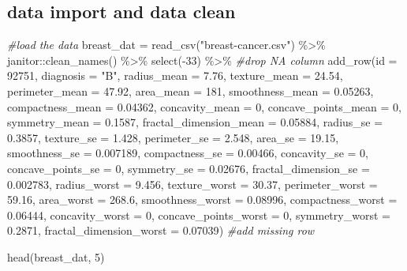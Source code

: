 \documentclass[
]{article}
\newenvironment{Shaded}{\begin{snugshade}}{\end{snugshade}}
\newcommand{\AttributeTok}[1]{\textcolor[rgb]{0.77,0.63,0.00}{#1}}
\newcommand{\CommentTok}[1]{\textcolor[rgb]{0.56,0.35,0.01}{\textit{#1}}}
\newcommand{\DecValTok}[1]{\textcolor[rgb]{0.00,0.00,0.81}{#1}}
\newcommand{\FloatTok}[1]{\textcolor[rgb]{0.00,0.00,0.81}{#1}}
\newcommand{\FunctionTok}[1]{\textcolor[rgb]{0.00,0.00,0.00}{#1}}
\newcommand{\NormalTok}[1]{#1}
\newcommand{\OtherTok}[1]{\textcolor[rgb]{0.56,0.35,0.01}{#1}}
\newcommand{\SpecialCharTok}[1]{\textcolor[rgb]{0.00,0.00,0.00}{#1}}
\newcommand{\StringTok}[1]{\textcolor[rgb]{0.31,0.60,0.02}{#1}}
\begin{document}
\hypertarget{data-import-and-data-clean}{%
\subsection{data import and data
clean}\label{data-import-and-data-clean}}

\begin{Shaded}
\begin{Highlighting}[]
\CommentTok{\#load the data}
\NormalTok{breast\_dat }\OtherTok{=} \FunctionTok{read\_csv}\NormalTok{(}\StringTok{"breast{-}cancer.csv"}\NormalTok{) }\SpecialCharTok{\%\textgreater{}\%} 
\NormalTok{  janitor}\SpecialCharTok{::}\FunctionTok{clean\_names}\NormalTok{() }\SpecialCharTok{\%\textgreater{}\%} 
  \FunctionTok{select}\NormalTok{(}\SpecialCharTok{{-}}\DecValTok{33}\NormalTok{) }\SpecialCharTok{\%\textgreater{}\%} \CommentTok{\#drop NA column}
  \FunctionTok{add\_row}\NormalTok{(}\AttributeTok{id =} \DecValTok{92751}\NormalTok{, }\AttributeTok{diagnosis =} \StringTok{"B"}\NormalTok{, }\AttributeTok{radius\_mean =} \FloatTok{7.76}\NormalTok{, }\AttributeTok{texture\_mean =} \FloatTok{24.54}\NormalTok{,}
          \AttributeTok{perimeter\_mean =} \FloatTok{47.92}\NormalTok{, }\AttributeTok{area\_mean =} \DecValTok{181}\NormalTok{, }\AttributeTok{smoothness\_mean =} \FloatTok{0.05263}\NormalTok{,}
          \AttributeTok{compactness\_mean =} \FloatTok{0.04362}\NormalTok{, }\AttributeTok{concavity\_mean =} \DecValTok{0}\NormalTok{, }
          \AttributeTok{concave\_points\_mean =} \DecValTok{0}\NormalTok{, }\AttributeTok{symmetry\_mean =} \FloatTok{0.1587}\NormalTok{,}
          \AttributeTok{fractal\_dimension\_mean =} \FloatTok{0.05884}\NormalTok{, }\AttributeTok{radius\_se =} \FloatTok{0.3857}\NormalTok{, }
          \AttributeTok{texture\_se =} \FloatTok{1.428}\NormalTok{, }\AttributeTok{perimeter\_se =} \FloatTok{2.548}\NormalTok{, }\AttributeTok{area\_se =} \FloatTok{19.15}\NormalTok{,}
          \AttributeTok{smoothness\_se =} \FloatTok{0.007189}\NormalTok{, }\AttributeTok{compactness\_se =} \FloatTok{0.00466}\NormalTok{, }\AttributeTok{concavity\_se =} \DecValTok{0}\NormalTok{,}
          \AttributeTok{concave\_points\_se =} \DecValTok{0}\NormalTok{, }\AttributeTok{symmetry\_se =} \FloatTok{0.02676}\NormalTok{, }
          \AttributeTok{fractal\_dimension\_se =} \FloatTok{0.002783}\NormalTok{, }\AttributeTok{radius\_worst =} \FloatTok{9.456}\NormalTok{, }
          \AttributeTok{texture\_worst =} \FloatTok{30.37}\NormalTok{, }\AttributeTok{perimeter\_worst =} \FloatTok{59.16}\NormalTok{, }\AttributeTok{area\_worst =} \FloatTok{268.6}\NormalTok{,}
          \AttributeTok{smoothness\_worst =} \FloatTok{0.08996}\NormalTok{, }\AttributeTok{compactness\_worst =} \FloatTok{0.06444}\NormalTok{,}
          \AttributeTok{concavity\_worst =} \DecValTok{0}\NormalTok{, }\AttributeTok{concave\_points\_worst =} \DecValTok{0}\NormalTok{, }
          \AttributeTok{symmetry\_worst =} \FloatTok{0.2871}\NormalTok{, }\AttributeTok{fractal\_dimension\_worst =} \FloatTok{0.07039}\NormalTok{) }
  \CommentTok{\#add missing row}


\FunctionTok{head}\NormalTok{(breast\_dat, }\DecValTok{5}\NormalTok{)}
\end{Highlighting}
\end{Shaded}
\end{document}
